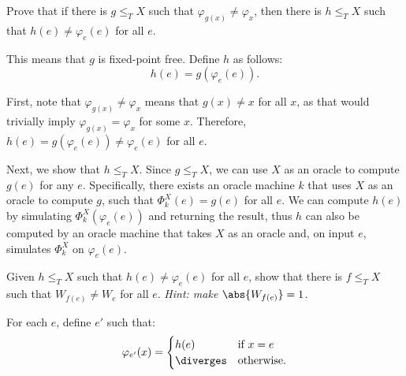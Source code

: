 \begin{problem}
  \begin{enumalph}
    \item Prove that if there is $g \leq_T X$ such that
      $\varphi_{g(x)} \neq \varphi_x$, then there is
      $h \leq_T X$ such that $h(e) \neq \varphi_e(e)$
      for all $e$.

      \begin{answer}
        This means that $g$ is fixed-point free.
        Define $h$ as follows:
        \[
          h(e) = g(\varphi_e(e)).
        \]

        \begin{enumarabic}
          \item First, note that $\varphi_{g(x)} \neq \varphi_x$
            means that $g(x) \neq x$ for all $x$,
            as that would trivially imply $\varphi_{g(x)} = \varphi_x$
            for some $x$.
            Therefore, $h(e) = g(\varphi_e(e)) \neq \varphi_e(e)$
            for all $e$.
          \item Next, we show that $h \leq_T X$.
            Since $g \leq_T X$, we can use $X$ as an oracle to compute $g(e)$
            for any $e$. Specifically, there exists an oracle machine $k$
            that uses $X$ as an oracle to compute $g$, such that
            $\Phi_k^X(e) = g(e)$ for all $e$.
            We can compute $h(e)$ by simulating $\varPhi_k^X(\varphi_e(e))$
            and returning the result, thus $h$ can also be computed
            by an oracle machine that takes $X$ as an oracle
            and, on input $e$, simulates $\varPhi_k^X$ on $\varphi_e(e)$.
        \end{enumarabic}
      \end{answer}

    \item Given $h \leq_T X$ such that $h(e) \neq \varphi_e(e)$ for all $e$,
      show that there is $f \leq_T X$ such that $W_{f(e)} \neq W_e$
      for all $e$. \newline
      \emph{Hint: make $\abs{W_{f(e)}} = 1$.}

      \begin{answer}

        For each $e$, define $e'$ such that:
        \[
          \varphi_{e'}(x) = \begin{cases}
            h(e) & \text{if } x = e \\
            \diverges & \text{otherwise.}
          \end{cases}
        \]


\end{answer}
\end{enumalph}
\end{problem}
